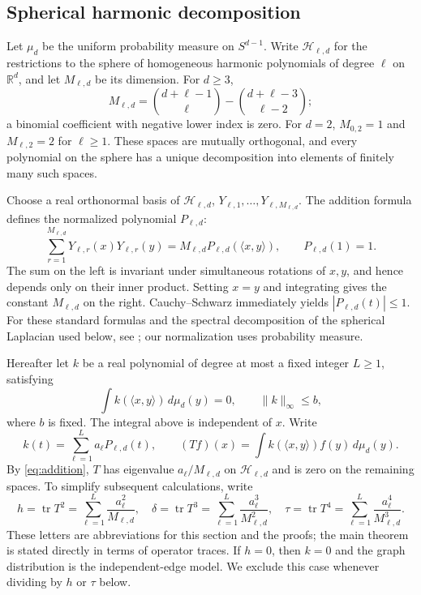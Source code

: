 \documentclass[11pt,reqno]{amsart}
\numberwithin{equation}{section}
\theoremstyle{definition}
\theoremstyle{remark}
\theoremstyle{definition}
\DeclareMathOperator{\tr}{tr}
\begin{document}
\subsection{Spherical harmonic decomposition}
Let $\mu_d$ be the uniform probability measure on $S^{d-1}$.
Write $\mathcal H_{\ell,d}$ for the restrictions to the sphere of homogeneous harmonic polynomials of degree $\ell$ on $\mathbb R^d$,
and let $M_{\ell,d}$ be its dimension. For $d\ge3$,
\[
 M_{\ell,d}=\binom{d+\ell-1}{\ell}-\binom{d+\ell-3}{\ell-2};
\]
a binomial coefficient with negative lower index is zero. For $d=2$, $M_{0,2}=1$ and
$M_{\ell,2}=2$ for $\ell\ge1$. These spaces are mutually orthogonal,
and every polynomial on the sphere has a unique decomposition into elements of finitely many such spaces.

Choose a real orthonormal basis of $\mathcal H_{\ell,d}$,
$Y_{\ell,1},\ldots,Y_{\ell,M_{\ell,d}}$.
The addition formula defines the normalized polynomial $P_{\ell,d}$:
\begin{equation}\label{eq:addition}
 \sum_{r=1}^{M_{\ell,d}}Y_{\ell,r}(x)Y_{\ell,r}(y)
   =M_{\ell,d}P_{\ell,d}(\langle x,y\rangle),\qquad P_{\ell,d}(1)=1.
\end{equation}
The sum on the left is invariant under simultaneous rotations of $x,y$, and hence depends only on their inner product.
Setting $x=y$ and integrating gives the constant $M_{\ell,d}$ on the right.
Cauchy--Schwarz immediately yields $|P_{\ell,d}(t)|\le1$.
For these standard formulas and the spectral decomposition of the spherical Laplacian used below, see
\cite[Sections 1.2 and 1.4]{DaiXu}; our normalization uses probability measure.

Hereafter let $k$ be a real polynomial of degree at most a fixed integer $L\ge1$,
satisfying
\[
 \int k(\langle x,y\rangle)\,d\mu_d(y)=0,\qquad
 \|k\|_\infty\le b,
\]
where $b$ is fixed. The integral above is independent of $x$.
Write
\[
 k(t)=\sum_{\ell=1}^{L}a_\ell P_{\ell,d}(t),\qquad
 (Tf)(x)=\int k(\langle x,y\rangle)f(y)\,d\mu_d(y).
\]
By \eqref{eq:addition}, $T$ has eigenvalue
$a_\ell/M_{\ell,d}$ on $\mathcal H_{\ell,d}$ and is zero on the remaining spaces. To simplify subsequent calculations, write
\begin{equation}\label{eq:hdt}
 h=\tr T^2=\sum_{\ell=1}^L\frac{a_\ell^2}{M_{\ell,d}},\quad
 \delta=\tr T^3=\sum_{\ell=1}^L\frac{a_\ell^3}{M_{\ell,d}^2},\quad
 \tau=\tr T^4=\sum_{\ell=1}^L\frac{a_\ell^4}{M_{\ell,d}^3}.
\end{equation}
These letters are abbreviations for this section and the proofs; the main theorem is stated directly in terms of operator traces.
If $h=0$, then $k=0$ and the graph distribution is the independent-edge model.
We exclude this case whenever dividing by $h$ or $\tau$ below.
\end{document}
